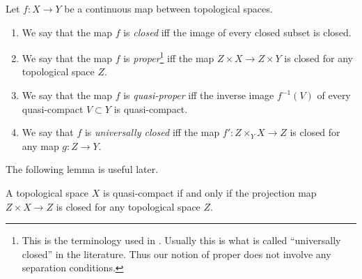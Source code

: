 \begin{definition}
\label{definition-proper-map}
Let $f : X\to Y$ be a continuous map between topological spaces.
\begin{enumerate}
\item We say that the map $f$ is {\it closed}
iff the image of every closed subset is closed.
\item We say that the map $f$ is {\it proper}\footnote{This is the
terminology used in \cite{Bourbaki}. Usually this is what
is called ``universally closed'' in the literature. Thus our notion
of proper does not involve any separation conditions.} iff
the map $Z\times X\to Z\times Y$ is closed for any topological space
$Z$.
\item We say that the map $f$ is {\it quasi-proper} iff
the inverse image $f^{-1}(V)$ of every quasi-compact $V \subset
Y$ is quasi-compact.
\item We say that $f$ is {\it universally closed} iff
the map $f': Z \times_Y X \to Z$ is closed for any map $g: Z \to Y$.
\end{enumerate}
\end{definition}

\noindent
The following lemma is useful later.

\begin{lemma}
\label{lemma-characterize-quasi-compact}
A topological space $X$ is quasi-compact if and only if the
projection map $Z \times X \to Z$ is closed for
any topological space $Z$.
\end{lemma}

